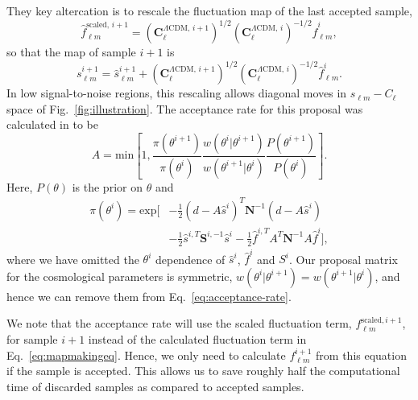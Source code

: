 \documentclass[twocolumn]{../common/aa}
\begin{document}
They key altercation is to rescale the fluctuation map of the last accepted sample,
\begin{equation}
    \hat{f}_{\ell m}^{\textrm{scaled},\, i+1} = \left(\textbf{C}^{\Lambda\mathrm{CDM},\,i+1}_{\ell}\right)^{1/2}\left(\textbf{C}^{\Lambda\mathrm{CDM},\,i}_{\ell}\right)^{-1/2} \hat{f}_{\ell m}^{i},
\end{equation}
so that the map of sample $i+1$ is
\begin{equation}
    s_{\ell m}^{i+1} = \hat{s}_{\ell m}^{i+1} + \left(\textbf{C}^{\Lambda\mathrm{CDM},\,i+1}_{\ell}\right)^{1/2}\left(\textbf{C}^{\Lambda\mathrm{CDM},\,i}_{\ell}\right)^{-1/2} \hat{f}_{\ell m}^{i}.
\end{equation}
In low signal-to-noise regions, this rescaling allows diagonal moves in $s_{\ell m} - C_\ell$ space of Fig.~\ref{fig:illustration}. The acceptance rate for this proposal was calculated in \cite{racine:2016} to be
\begin{equation}
    \label{eq:acceptance-rate}
    A = \mathrm{min}\left[1, \frac{\pi(\theta^{i+1})}{\pi(\theta^i)} \frac{w(\theta^{i} |\theta^{i+1})}{w(\theta^{i+1} |\theta^i) }\frac{P(\theta^{i+1})}{P(\theta^i)} \right].
\end{equation}
Here, $P(\theta)$ is the prior on $\theta$ and
\begin{align}
    \nonumber
    \pi(\theta^{i}) = \mathrm{exp}\bigg[&-\frac12 \left(d-A\hat{s}^i\right)^T \textbf{N}^{-1}\left(d-A\hat{s}^i\right)\\
    &-\frac12 \hat{s}^{i,T} \textbf{S}^{i, -1}\hat{s}^i -\frac12 \hat{f}^{i, T}A^T\textbf{N}^{-1} A\hat{f}^i\bigg],
\end{align}
where we have omitted the $\theta^i$ dependence of $\hat{s}^i$, $\hat{f}^i$ and $S^i$. Our proposal matrix for the cosmological parameters is symmetric, $w(\theta^{i} |\theta^{i+1}) = w(\theta^{i+1} |\theta^{i})$, and hence we can remove them from Eq.~\eqref{eq:acceptance-rate}.

We note that the acceptance rate will use the scaled fluctuation term, $f_{\ell m}^{\textrm{scaled}, i+1}$, for sample $i+1$ instead of the calculated fluctuation term in Eq.~\eqref{eq:mapmakingeq}. Hence, we only need to calculate $f_{\ell m}^{i+1}$ from this equation if the sample is accepted. This allows us to save roughly half the computational time of discarded samples as compared to accepted samples.
\end{document}
